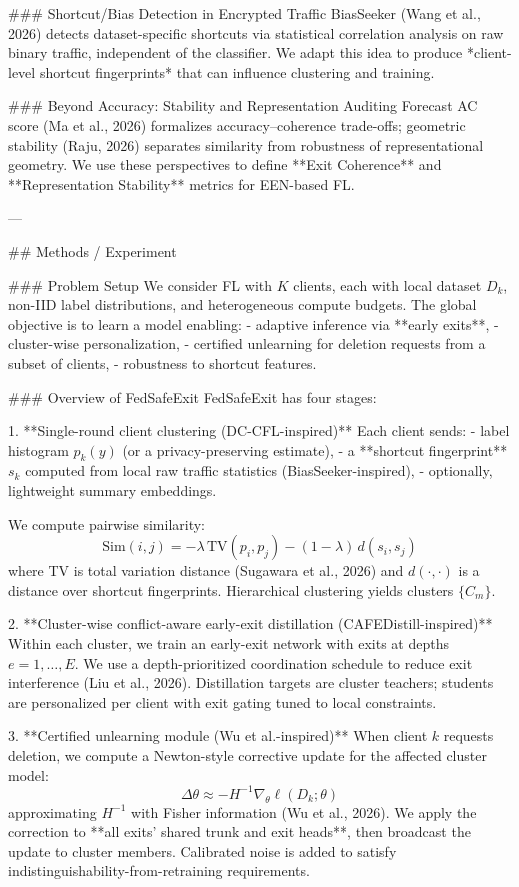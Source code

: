 ### Shortcut/Bias Detection in Encrypted Traffic  
BiasSeeker (Wang et al., 2026) detects dataset-specific shortcuts via statistical correlation analysis on raw binary traffic, independent of the classifier. We adapt this idea to produce *client-level shortcut fingerprints* that can influence clustering and training.

### Beyond Accuracy: Stability and Representation Auditing  
Forecast AC score (Ma et al., 2026) formalizes accuracy–coherence trade-offs; geometric stability (Raju, 2026) separates similarity from robustness of representational geometry. We use these perspectives to define **Exit Coherence** and **Representation Stability** metrics for EEN-based FL.

---

## Methods / Experiment  

### Problem Setup  
We consider FL with \(K\) clients, each with local dataset \(D_k\), non-IID label distributions, and heterogeneous compute budgets. The global objective is to learn a model enabling:
- adaptive inference via **early exits**,
- cluster-wise personalization,
- certified unlearning for deletion requests from a subset of clients,
- robustness to shortcut features.

### Overview of FedSafeExit  
FedSafeExit has four stages:

1. **Single-round client clustering (DC-CFL-inspired)**  
Each client sends:
- label histogram \(p_k(y)\) (or a privacy-preserving estimate),
- a **shortcut fingerprint** \(s_k\) computed from local raw traffic statistics (BiasSeeker-inspired),
- optionally, lightweight summary embeddings.

We compute pairwise similarity:
\[
\text{Sim}(i,j)= -\lambda \, \text{TV}(p_i,p_j) - (1-\lambda)\, d(s_i,s_j)
\]
where TV is total variation distance (Sugawara et al., 2026) and \(d(\cdot,\cdot)\) is a distance over shortcut fingerprints. Hierarchical clustering yields clusters \(\{C_m\}\).

2. **Cluster-wise conflict-aware early-exit distillation (CAFEDistill-inspired)**  
Within each cluster, we train an early-exit network with exits at depths \(e=1,\dots,E\). We use a depth-prioritized coordination schedule to reduce exit interference (Liu et al., 2026). Distillation targets are cluster teachers; students are personalized per client with exit gating tuned to local constraints.

3. **Certified unlearning module (Wu et al.-inspired)**  
When client \(k\) requests deletion, we compute a Newton-style corrective update for the affected cluster model:
\[
\Delta \theta \approx - H^{-1} \nabla_\theta \ell(D_k;\theta)
\]
approximating \(H^{-1}\) with Fisher information (Wu et al., 2026). We apply the correction to **all exits’ shared trunk and exit heads**, then broadcast the update to cluster members. Calibrated noise is added to satisfy indistinguishability-from-retraining requirements.

